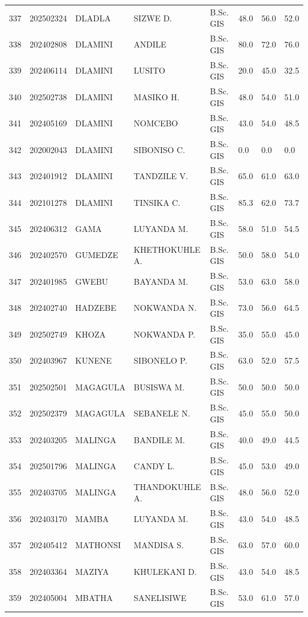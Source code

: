 \documentclass[12pt]{article}
\begin{document}
\begin{longtable}{@{}llllllll@{}}
337 & 202502324 & DLADLA & SIZWE D. & B.Sc. GIS & 48.0 & 56.0 & 52.0 \\
338 & 202402808 & DLAMINI & ANDILE & B.Sc. GIS & 80.0 & 72.0 & 76.0 \\
339 & 202406114 & DLAMINI & LUSITO & B.Sc. GIS & 20.0 & 45.0 & 32.5 \\
340 & 202502738 & DLAMINI & MASIKO H. & B.Sc. GIS & 48.0 & 54.0 & 51.0 \\
341 & 202405169 & DLAMINI & NOMCEBO & B.Sc. GIS & 43.0 & 54.0 & 48.5 \\
342 & 202002043 & DLAMINI & SIBONISO C. & B.Sc. GIS & 0.0 & 0.0 & 0.0 \\
343 & 202401912 & DLAMINI & TANDZILE V. & B.Sc. GIS & 65.0 & 61.0 & 63.0 \\
344 & 202101278 & DLAMINI & TINSIKA C. & B.Sc. GIS & 85.3 & 62.0 & 73.7 \\
345 & 202406312 & GAMA & LUYANDA M. & B.Sc. GIS & 58.0 & 51.0 & 54.5 \\
346 & 202402570 & GUMEDZE & KHETHOKUHLE A. & B.Sc. GIS & 50.0 & 58.0 & 54.0 \\
347 & 202401985 & GWEBU & BAYANDA M. & B.Sc. GIS & 53.0 & 63.0 & 58.0 \\
348 & 202402740 & HADZEBE & NOKWANDA N. & B.Sc. GIS & 73.0 & 56.0 & 64.5 \\
349 & 202502749 & KHOZA & NOKWANDA P. & B.Sc. GIS & 35.0 & 55.0 & 45.0 \\
350 & 202403967 & KUNENE & SIBONELO P. & B.Sc. GIS & 63.0 & 52.0 & 57.5 \\
351 & 202502501 & MAGAGULA & BUSISWA M. & B.Sc. GIS & 50.0 & 50.0 & 50.0 \\
352 & 202502379 & MAGAGULA & SEBANELE N. & B.Sc. GIS & 45.0 & 55.0 & 50.0 \\
353 & 202403205 & MALINGA & BANDILE M. & B.Sc. GIS & 40.0 & 49.0 & 44.5 \\
354 & 202501796 & MALINGA & CANDY L. & B.Sc. GIS & 45.0 & 53.0 & 49.0 \\
355 & 202403705 & MALINGA & THANDOKUHLE A. & B.Sc. GIS & 48.0 & 56.0 & 52.0 \\
356 & 202403170 & MAMBA & LUYANDA M. & B.Sc. GIS & 43.0 & 54.0 & 48.5 \\
357 & 202405412 & MATHONSI & MANDISA S. & B.Sc. GIS & 63.0 & 57.0 & 60.0 \\
358 & 202403364 & MAZIYA & KHULEKANI D. & B.Sc. GIS & 43.0 & 54.0 & 48.5 \\
359 & 202405004 & MBATHA & SANELISIWE & B.Sc. GIS & 53.0 & 61.0 & 57.0 \\

\end{longtable}
\end{document}
